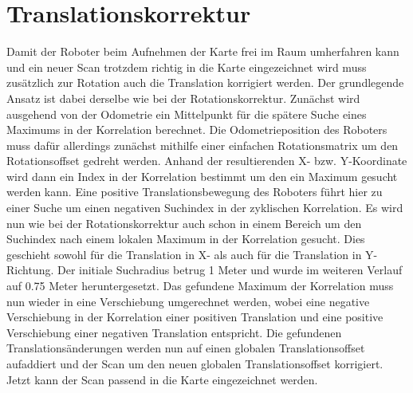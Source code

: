 \section{Translationskorrektur}

Damit der Roboter beim Aufnehmen der Karte frei im Raum umherfahren kann und ein neuer Scan trotzdem richtig in die Karte eingezeichnet wird muss zusätzlich zur Rotation auch die Translation korrigiert werden. Der grundlegende Ansatz ist dabei derselbe wie bei der Rotationskorrektur. Zunächst wird ausgehend von der Odometrie ein Mittelpunkt für die spätere Suche eines Maximums in der Korrelation berechnet. Die Odometrieposition des Roboters muss dafür allerdings zunächst mithilfe einer einfachen Rotationsmatrix um den Rotationsoffset gedreht werden. Anhand der resultierenden X- bzw. Y-Koordinate wird dann ein Index in der Korrelation bestimmt um den ein Maximum gesucht werden kann. Eine positive Translationsbewegung des Roboters führt hier zu einer Suche um einen negativen Suchindex in der zyklischen Korrelation.
Es wird nun wie bei der Rotationskorrektur auch schon in einem Bereich um den Suchindex nach einem lokalen Maximum in der Korrelation gesucht. Dies geschieht sowohl für die Translation in X- als auch für die Translation in Y-Richtung. Der initiale Suchradius betrug 1 Meter und wurde im weiteren Verlauf auf 0.75 Meter heruntergesetzt.
Das gefundene Maximum der Korrelation muss nun wieder in eine Verschiebung umgerechnet werden, wobei eine negative Verschiebung in der Korrelation einer positiven Translation und eine positive Verschiebung einer negativen Translation entspricht.
Die gefundenen Translationsänderungen werden nun auf einen globalen Translationsoffset aufaddiert und der Scan um den neuen globalen Translationsoffset korrigiert.
Jetzt kann der Scan passend in die Karte eingezeichnet werden.

